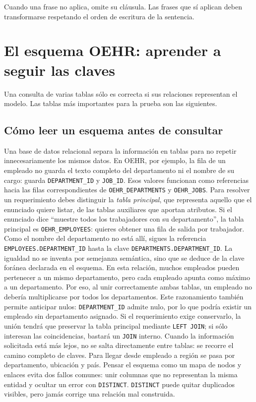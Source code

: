\documentclass[11pt,a4paper]{article}
\newcommand{\campo}[1]{\texttt{#1}}
\newcommand{\tabla}[1]{\texttt{#1}}
\begin{document}
Cuando una frase no aplica, omite su cláusula. Las frases que sí aplican deben transformarse
respetando el orden de escritura de la sentencia.

\section{El esquema OEHR: aprender a seguir las claves}

Una consulta de varias tablas sólo es correcta si sus relaciones representan el modelo. Las tablas
más importantes para la prueba son las siguientes.

\subsection*{Cómo leer un esquema antes de consultar}

Una base de datos relacional separa la información en tablas para no repetir innecesariamente los
mismos datos. En OEHR, por ejemplo, la fila de un empleado no guarda el texto completo del
departamento ni el nombre de su cargo: guarda \campo{DEPARTMENT_ID} y \campo{JOB_ID}. Esos valores
funcionan como referencias hacia las filas correspondientes de \tabla{OEHR_DEPARTMENTS} y
\tabla{OEHR_JOBS}. Para resolver un requerimiento debes distinguir la \emph{tabla principal}, que
representa aquello que el enunciado quiere listar, de las tablas auxiliares que aportan atributos. Si
el enunciado dice ``muestre todos los trabajadores con su departamento'', la tabla principal es
\tabla{OEHR_EMPLOYEES}: quieres obtener una fila de salida por trabajador. Como el nombre del
departamento no está allí, sigues la referencia \campo{EMPLOYEES.DEPARTMENT_ID} hasta la clave
\campo{DEPARTMENTS.DEPARTMENT_ID}. La igualdad no se inventa por semejanza semántica, sino que se
deduce de la clave foránea declarada en el esquema. En esta relación, muchos empleados pueden
pertenecer a un mismo departamento, pero cada empleado apunta como máximo a un departamento. Por
eso, al unir correctamente ambas tablas, un empleado no debería multiplicarse por todos los
departamentos. Este razonamiento también permite anticipar nulos: \campo{DEPARTMENT_ID} admite nulo,
por lo que podría existir un empleado sin departamento asignado. Si el requerimiento exige conservarlo,
la unión tendrá que preservar la tabla principal mediante \campo{LEFT JOIN}; si sólo interesan las
coincidencias, bastará un \campo{JOIN} interno. Cuando la información solicitada está más lejos, no se
salta directamente entre tablas: se recorre el camino completo de claves. Para llegar desde empleado a
región se pasa por departamento, ubicación y país. Pensar el esquema como un mapa de nodos y enlaces
evita dos fallos comunes: unir columnas que no representan la misma entidad y ocultar un error con
\campo{DISTINCT}. \campo{DISTINCT} puede quitar duplicados visibles, pero jamás corrige una relación
mal construida.
\end{document}
